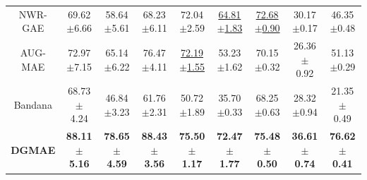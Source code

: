 \documentclass[sigconf]{acmart}
\begin{document}
\begin{table}
{\begin{tabular}{c|cccccccc}
        NWR-GAE & 69.62$\pm$6.66  & 58.64$\pm$5.61 & 68.23$\pm$6.11 & 72.04$\pm$2.59&\underline{64.81$\pm$1.83} & \underline{72.68$\pm$0.90}& 30.17$\pm$0.17&46.35$\pm$0.48\\
        AUG-MAE & 72.97$\pm$7.15& 65.14$\pm$6.22 & 76.47$\pm$4.11 & \underline{72.19$\pm$1.55} & 53.23$\pm$1.62& 70.15$\pm$0.32& 26.36 $\pm$ 0.92& 51.13$\pm$0.29 \\
        Bandana & 68.73$\pm$ 4.24 & 46.84$\pm$3.23 & 61.76$\pm$2.31 & 50.72$\pm$1.89 &35.70 $\pm$0.33 & 68.25$\pm$0.63&28.32$\pm$0.94 &21.35 $\pm$ 0.49 \\
        \textbf{DGMAE} & \textbf{88.11$\pm$5.16} & \textbf{78.65$\pm$4.59} & \textbf{88.43$\pm$3.56} & \textbf{75.50$\pm$1.17} & \textbf{72.47$\pm$1.77} & \textbf{75.48$\pm$0.50} & \textbf{36.61$\pm$0.74} & \textbf{76.62$\pm$0.41} \\
             
        \bottomrule
    \end{tabular}}
    \label{table.1}
\end{table}
\end{document}
